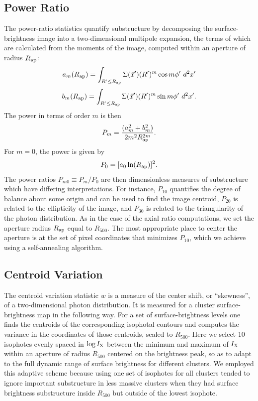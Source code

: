 \documentclass{aastex} \usepackage{natbib}
\begin{document}
\subsection{Power Ratio}
The power-ratio statistics
\citep{1995ApJ...452..522B,2006ApJ...639...64O} quantify substructure
by decomposing the surface-brightness image into a two-dimensional
multipole expansion, the terms of which are calculated from the
moments of the image, computed within an aperture of radius $R_{\rm ap}$:
\begin{equation}
  \label{eq:a_m}
  a_m(\Rap) = \int_{R' \leq \Rap}\Sigma(\vec x')(R')^m \cos m \phi'\ d^2x'
\end{equation}
\begin{equation}
  \label{eq:b_m}
  b_m(\Rap) = \int_{R' \leq \Rap}\Sigma(\vec x')(R')^m \sin m \phi'\ d^2x'.
\end{equation}
The power in terms of order $m$ is then
\begin{equation}
  \label{eq:pm}
  P_m = \frac{(a_m^2 + b_m^2)}{2m^2R_{\rm ap}^{2m}}.
\end{equation}
For $m = 0$, the power is given by
\begin{equation}
  \label{eq:p0}
  P_0 = [a_0 \ln(R_{\rm ap})]^2.
\end{equation}
The power ratios $P_{m0} \equiv P_m / P_0$ are then dimensionless
measures of substructure which have differing interpretations.  For
instance, $P_{10}$ quantifies the degree of balance about some origin
and can be used to find the image centroid, $P_{20}$ is related to the
ellipticity of the image, and $P_{30}$ is related to the triangularity
of the photon distribution.  As in the case of the axial ratio
computations, we set the aperture radius $R_{\rm ap}$ equal to $R_{500}$.
The most appropriate place to center the aperture is at the set of
pixel coordinates that minimizes $P_{10}$, which we achieve using a
self-annealing algorithm.

\subsection{Centroid Variation}
The centroid variation statistic $w$ is a measure of the center shift,
or ``skewness'', of a two-dimensional photon distribution.  It is
measured for a cluster surface-brightness map in the following way.
For a set of surface-brightness levels one finds the centroids of the
corresponding isophotal contours and computes the variance in the
coordinates of those centroids, scaled to $R_{500}$.  Here we select
10 isophotes evenly spaced in $\log I_{\rm X}$ between the minimum and
maximum of $I_{\rm X}$ within an aperture of radius $R_{500}$ centered
on the brightness peak, so as to adapt to the full dynamic range of
surface brightness for different clusters.  We employed this adaptive
scheme because using one set of isophotes for all clusters tended to
ignore important substructure in less massive clusters when they had
surface brightness substructure inside $R_{500}$ but outside of the
lowest isophote.
\end{document}

